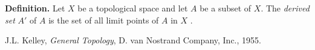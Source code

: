 \documentclass[12pt]{article}
\begin{document}
{\bf Definition.}
Let $X$ be a topological space and let $A$ be a subset of $X$.
The \emph{derived set} $A'$ of $A$ is the set of all limit points
of $A$ in $X$ \cite{kelley}.

\begin{thebibliography}{9}
J.L. Kelley,
\emph{General Topology},
D. van Nostrand Company, Inc., 1955.
\end{thebibliography}
\end{document}
